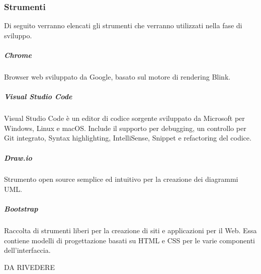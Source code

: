 		\subsubsection{Strumenti}
		Di seguito verranno elencati gli strumenti che verranno utilizzati nella fase di sviluppo.
			\subparagraph{Chrome \\}
			Browser web sviluppato da Google, basato sul motore di rendering Blink.
			\subparagraph{Visual Studio Code \\}
			Visual Studio Code è un editor di codice sorgente sviluppato da Microsoft per Windows, Linux e macOS. Include il supporto per debugging, un controllo per Git integrato, Syntax highlighting, IntelliSense, Snippet e refactoring del codice.
			\subparagraph{Draw.io \\}
			Strumento open source semplice ed  intuitivo per la creazione dei diagrammi UML.
			\subparagraph{Bootstrap \\}
			Raccolta di strumenti liberi per la creazione di siti e applicazioni per il Web. Essa contiene modelli di progettazione basati su HTML e CSS per le varie componenti dell'interfaccia.
			
			DA RIVEDERE
			